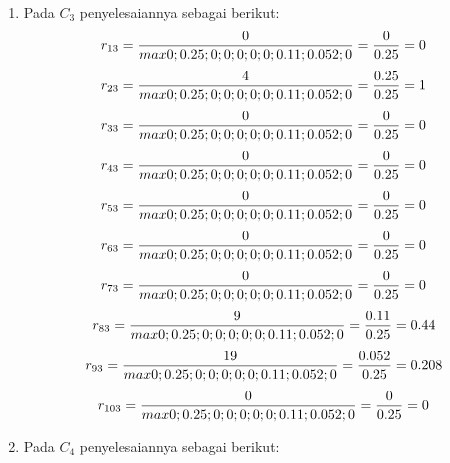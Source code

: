 \documentclass[a4paper,twoside]{article}
\begin{document}
\begin{enumerate}
\begin{enumerate}
\item Pada $C_{3}$ penyelesaiannya sebagai berikut:
\begin{displaymath}
r_{13} = \frac{0}{max {0;0.25;0;0;0;0;0;0.11;0.052;0}} = \frac{0}{0.25} = 0\\
\end {displaymath}
\begin{displaymath}
r_{23} = \frac{4}{max {0;0.25;0;0;0;0;0;0.11;0.052;0}} = \frac{0.25}{0.25} = 1\\
\end{displaymath}
\begin{displaymath}
r_{33} = \frac{0}{max {0;0.25;0;0;0;0;0;0.11;0.052;0}} = \frac{0}{0.25} = 0\\
\end {displaymath}
\begin{displaymath}
r_{43} = \frac{0}{max {0;0.25;0;0;0;0;0;0.11;0.052;0}} = \frac{0}{0.25} = 0\\
\end {displaymath}
\begin{displaymath}
r_{53} = \frac{0}{max {0;0.25;0;0;0;0;0;0.11;0.052;0}} = \frac{0}{0.25} = 0\\
\end {displaymath}
\begin{displaymath}
r_{63} = \frac{0}{max {0;0.25;0;0;0;0;0;0.11;0.052;0}} = \frac{0}{0.25} = 0\\
\end {displaymath}
\begin{displaymath}
r_{73} = \frac{0}{max {0;0.25;0;0;0;0;0;0.11;0.052;0}} = \frac{0}{0.25} = 0\\
\end {displaymath}
\begin{displaymath}
r_{83} = \frac{9}{max {0;0.25;0;0;0;0;0;0.11;0.052;0}} = \frac{0.11}{0.25} = 0.44\\
\end {displaymath}
\begin{displaymath}
r_{93} = \frac{19}{max {0;0.25;0;0;0;0;0;0.11;0.052;0}} = \frac{0.052}{0.25} = 0.208\\
\end {displaymath}
\begin{displaymath}
r_{103} = \frac{0}{max {0;0.25;0;0;0;0;0;0.11;0.052;0}} = \frac{0}{0.25} = 0\\
\end {displaymath}
\item Pada $C_{4}$ penyelesaiannya sebagai berikut:
\begin{displaymath}

\end{displaymath}
\end{enumerate}
\end{enumerate}
\end{document}
